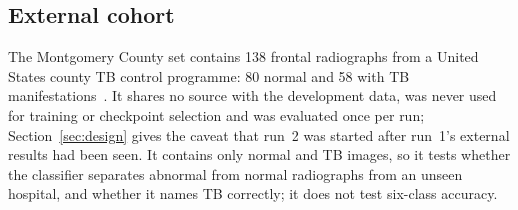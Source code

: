 \subsection{External cohort}
The Montgomery County set contains 138 frontal radiographs from a United States county TB control programme: 80 normal and 58 with TB manifestations~\cite{jaeger2014two,candemir2014lung}. It shares no source with the development data, was never used for training or checkpoint selection and was evaluated once per run; Section~\ref{sec:design} gives the caveat that run~2 was started after run~1's external results had been seen. It contains only normal and TB images, so it tests whether the classifier separates abnormal from normal radiographs from an unseen hospital, and whether it names TB correctly; it does not test six-class accuracy.
